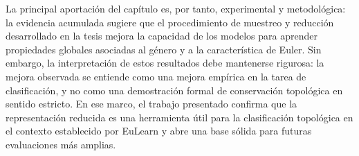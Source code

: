 La principal aportación del capítulo es, por tanto, experimental y metodológica: la evidencia acumulada sugiere que el procedimiento de muestreo y reducción desarrollado en la tesis mejora la capacidad de los modelos para aprender propiedades globales asociadas al género y a la característica de Euler. Sin embargo, la interpretación de estos resultados debe mantenerse rigurosa: la mejora observada se entiende como una mejora empírica en la tarea de clasificación, y no como una demostración formal de conservación topológica en sentido estricto. En ese marco, el trabajo presentado confirma que la representación reducida es una herramienta útil para la clasificación topológica en el contexto establecido por EuLearn y abre una base sólida para futuras evaluaciones más amplias.
